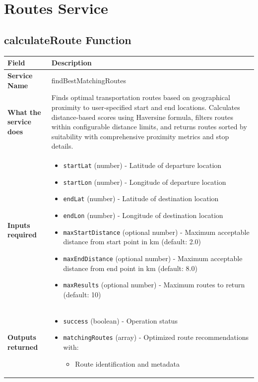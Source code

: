\documentclass[11pt,a4paper]{article}
\begin{document}
\section{Routes Service}


\subsection{calculateRoute Function}

\begin{longtable}{|p{4cm}|p{12cm}|}
\hline
\textbf{Field} & \textbf{Description} \\
\hline
\textbf{Service Name} & findBestMatchingRoutes \\
\hline
\textbf{What the service does} & 
Finds optimal transportation routes based on geographical proximity to user-specified start and end locations. Calculates distance-based scores using Haversine formula, filters routes within configurable distance limits, and returns routes sorted by suitability with comprehensive proximity metrics and stop details. \\
\hline
\textbf{Inputs required} & 
\begin{itemize}[nosep]
\item \texttt{startLat} (number) - Latitude of departure location
\item \texttt{startLon} (number) - Longitude of departure location
\item \texttt{endLat} (number) - Latitude of destination location
\item \texttt{endLon} (number) - Longitude of destination location
\item \texttt{maxStartDistance} (optional number) - Maximum acceptable distance from start point in km (default: 2.0)
\item \texttt{maxEndDistance} (optional number) - Maximum acceptable distance from end point in km (default: 8.0)
\item \texttt{maxResults} (optional number) - Maximum routes to return (default: 10)
\end{itemize} \\
\hline
\textbf{Outputs returned} & 
\begin{itemize}[nosep]
\item \texttt{success} (boolean) - Operation status
\item \texttt{matchingRoutes} (array) - Optimized route recommendations with:
  \begin{itemize}[nosep]
  \item Route identification and metadata

\end{itemize}
\end{itemize}
\end{longtable}
\end{document}
